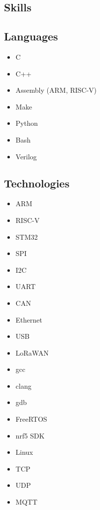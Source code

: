 \documentclass[lighthipster]{styles}
\begin{document}
\begin{paracol}{2}
{\vspace{0.05cm}

\section*{\textbf{Skills}}
\subsection*{Languages}
\vspace{-0.4cm}
\begin{multicols}{2}
    \begin{itemize}
        \item C
        \item C++
        \item Assembly (ARM, RISC-V)
        \item Make
        \item Python
        \item Bash
        \item Verilog
    \end{itemize}
\end{multicols}

\subsection*{Technologies}
\vspace{-0.4cm}
\begin{multicols}{2}
    \begin{itemize}
        \item ARM
        \item RISC-V
        \item STM32
        \item SPI
        \item I2C
        \item UART
        \item CAN
        \item Ethernet
        \item USB
        \item LoRaWAN
        \item gcc
        \item clang
        \item gdb
        \item FreeRTOS
        \item nrf5 SDK
        \item Linux
        \item TCP
        \item UDP
        \item MQTT
    \end{itemize}
\end{multicols}

}
\end{paracol}
\end{document}
